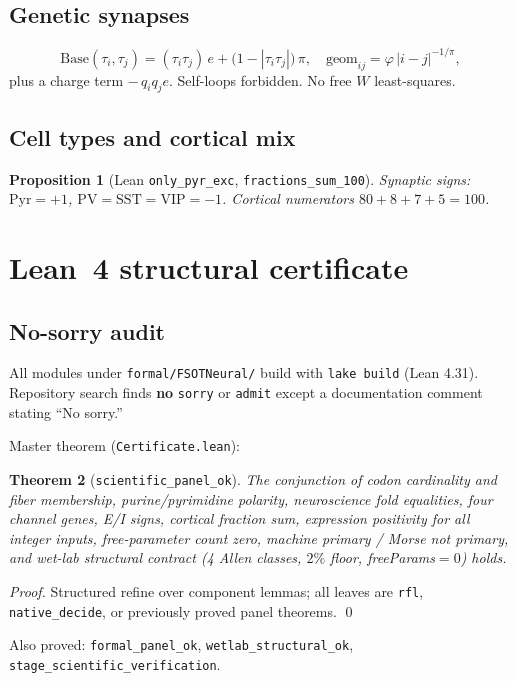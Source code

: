 \documentclass[11pt,a4paper]{article}
\newtheorem{theorem}{Theorem}
\newtheorem{proposition}[theorem]{Proposition}
\begin{document}
\subsection{Genetic synapses}
\label{sec:synapses}

\[
\mathrm{Base}(\tau_i,\tau_j)=(\tau_i\tau_j)\,e + \bigl(1-|\tau_i\tau_j|\bigr)\,\pi,
\quad
\mathrm{geom}_{ij}=\varphi\,|i-j|^{-1/\pi},
\]
plus a charge term \(-\,q_i q_j e\). Self-loops forbidden. No free \(W\) least-squares.

\subsection{Cell types and cortical mix}
\begin{proposition}[Lean \texttt{only\_pyr\_exc}, \texttt{fractions\_sum\_100}]
Synaptic signs: \(\mathrm{Pyr}=+1\), \(\mathrm{PV}=\mathrm{SST}=\mathrm{VIP}=-1\).
Cortical numerators \(80+8+7+5=100\).
\end{proposition}

\section{Lean~4 structural certificate}
\label{sec:lean}

\subsection{No-sorry audit}
All modules under \texttt{formal/FSOTNeural/} build with \texttt{lake build}
(Lean 4.31). Repository search finds \textbf{no} \texttt{sorry} or \texttt{admit}
except a documentation comment stating ``No sorry.''

Master theorem (\texttt{Certificate.lean}):
\begin{theorem}[\texttt{scientific\_panel\_ok}]
The conjunction of codon cardinality and fiber membership, purine/pyrimidine
polarity, neuroscience fold equalities, four channel genes, E/I signs, cortical
fraction sum, expression positivity for all integer inputs, free-parameter count
zero, machine primary / Morse not primary, and wet-lab structural contract
(4 Allen classes, \(2\%\) floor, freeParams\(=0\)) holds.
\end{theorem}
\noindent\textit{Proof.} Structured refine over component lemmas; all leaves are
\texttt{rfl}, \texttt{native\_decide}, or previously proved panel theorems.
\qed

Also proved: \texttt{formal\_panel\_ok}, \texttt{wetlab\_structural\_ok},
\texttt{stage\_scientific\_verification}.
\end{document}
